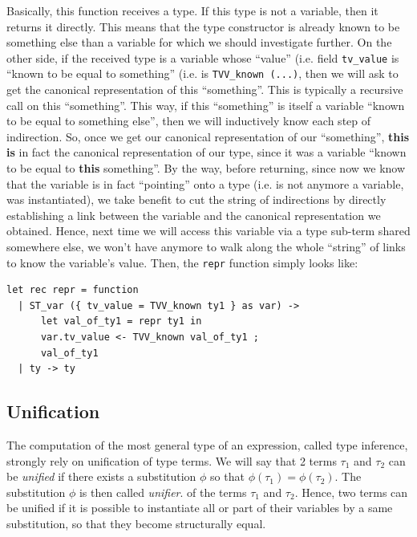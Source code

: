 Basically, this function receives a type. If this type is not a
variable, then it returns it directly. This means that the type
constructor is already known to be something else than a variable for
which we should investigate further. On the other side, if the
received type is a variable whose ``value'' (i.e. field
{\tt tv\_value} is ``known to be equal to something'' (i.e. is
{\tt TVV\_known (...)}, then we will ask to get the canonical
representation of this ``something''. This is typically a recursive
call on this ``something''. This way, if this ``something'' is itself
a variable ``known to be equal to something else'', then we will
inductively know each step of indirection. So, once we get our
canonical representation of our ``something'', {\bf this is} in fact
the canonical representation of our type, since it was a variable
``known to be equal to {\bf this} something''. By the way, before
returning, since now we know that the variable is in fact ``pointing''
onto a type (i.e. is not anymore a variable, was instantiated), we
take benefit to cut the string of indirections by directly
establishing a link between the variable and the canonical
representation we obtained. Hence, next time we will access this
variable via a type sub-term shared somewhere else, we won't have
anymore to walk along the whole ``string'' of links to know the
variable's value. Then, the {\tt repr} function simply looks like:

{\footnotesize
\begin{lstlisting}[language=MyOCaml,
                   title=Getting the canonical representation of a type]
let rec repr = function
  | ST_var ({ tv_value = TVV_known ty1 } as var) ->
      let val_of_ty1 = repr ty1 in
      var.tv_value <- TVV_known val_of_ty1 ;
      val_of_ty1
  | ty -> ty
\end{lstlisting}
}


\subsection{Unification}
The computation of the most general type of an expression, called type
inference, strongly rely on unification of type terms. We will say
that 2 terms $\tau_1$ and $\tau_2$ can be {\em unified} if there exists
a substitution $\phi$ so that $\phi(\tau_1) = \phi (\tau_2)$. The
substitution $\phi$ is then called {\em unifier}.
 of the terms $\tau_1$ and $\tau_2$. Hence, two terms
can be unified if it is possible to instantiate all or part of their
variables by a same substitution, so that they become structurally
equal.

